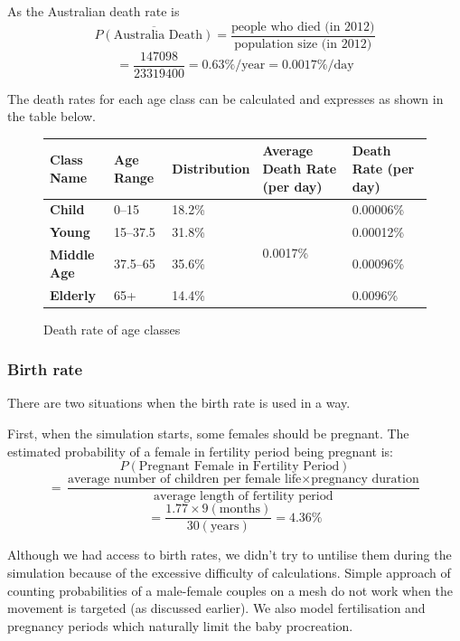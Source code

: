 \documentclass[a4paper]{article}
\newcommand*\mean[1]{\overline{#1}}
\begin{document}
As the Australian death rate \cite{absdeath} is
$$ \mean{P(\text{Australia Death})} = \frac{\text{people who died (in 2012)}}{\text{population size (in 2012)}} $$
$$ = \frac{147098}{23319400} = 0.63\%/\text{year} = 0.0017\%/\text{day} $$

The death rates for each age class can be calculated and expresses as shown in the table below.

\begin{figure}[ht]
    \centering
    \begin{tabu} {| X[1.1,c,p] || X[0.7,c,p] | X[1.2,c,p] | X[1.1,c,p] | X[1,c,p] |}
        \rowfont{\bfseries}
        \hline
        Class Name &
        Age Range &
        Distribution &
        Average Death Rate (per day) &
        Death Rate (per day) \\
        \hline
        \hline
        \textbf{Child} & 0--15 & 18.2\% &  & 0.00006\% \\
        \textbf{Young} & 15--37.5 & 31.8\% & & 0.00012\% \\
        \textbf{Middle Age} & 37.5--65 & 35.6\% & & 0.00096\% \\
        \textbf{Elderly} & 65+ & 14.4\% & & 0.0096\% \\
        \hline
    \end{tabu}
    \caption{Death rate of age classes}
\end{figure}

\subsubsection{Birth rate}

There are two situations when the birth rate is used in a way.

First, when the simulation starts, some females should be pregnant.
The estimated probability of a female in fertility period being pregnant is:
$$ P(\text{Pregnant Female in Fertility Period}) $$
$$ = \frac{\text{average number of children per female life} \times \text{pregnancy duration}}{\text{average length of fertility period}} $$
$$ = \frac{1.77 \times 9 (\text{months})}{30 (\text{years})} = 4.36\% $$

Although we had access to birth rates, we didn't try to untilise them during the simulation because of the excessive difficulty of calculations.
Simple approach of counting probabilities of a male-female couples on a mesh do not work when the movement is targeted (as discussed earlier).
We also model fertilisation and pregnancy periods which naturally limit the baby procreation.
\end{document}
